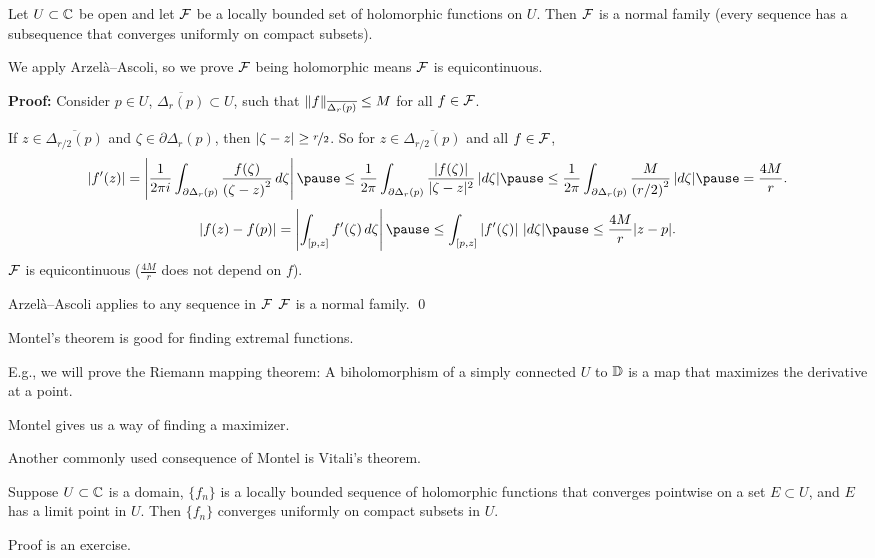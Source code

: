 \documentclass[10pt,aspectratio=169]{beamer}
\begin{document}
\begin{frame}
\begin{theorem}[Montel]
Let $U \subset {\mathbb{C}}$ be open and let ${\mathcal{F}}$
be a locally bounded set of holomorphic functions on $U$.
Then ${\mathcal{F}}$ is a normal family \pause (every sequence has a subsequence that
converges uniformly on compact subsets).
\end{theorem}

\pause
We apply Arzel\`a--Ascoli,
so we prove ${\mathcal{F}}$
being holomorphic means ${\mathcal{F}}$ is equicontinuous.

\medskip

\pause
\textbf{Proof:}
Consider $p \in U$, $\overline{\Delta_r(p)} \subset U$, such that
$\lVert {f} \rVert_{\overline{\Delta_r(p)}} \leq M$ for all $f \in {\mathcal{F}}$.
\pause

If $z \in \overline{\Delta_{r/2}(p)}$ and $\zeta \in \partial \Delta_r(p)$,
then $\lvert {\zeta-z} \rvert \geq \nicefrac{r}{2}$.
\pause
So for $z \in \overline{\Delta_{r/2}(p)}$ and all $f \in {\mathcal{F}}$,
\[
\abs{f'(z)}
=
\abs{
\frac{1}{2\pi i}
\int_{\partial \Delta_r(p)}
\frac{f(\zeta)}{{(\zeta-z)}^2} \, d\zeta
}
\pause \leq
\frac{1}{2\pi}
\int_{\partial \Delta_r(p)}
\frac{\sabs{f(\zeta)}}{\sabs{\zeta-z}^2} \, \sabs{d\zeta}
\pause \leq
\frac{1}{2\pi}
\int_{\partial \Delta_r(p)}
\frac{M}{{(r/2)}^2} \, \sabs{d\zeta}
\pause =
\frac{4 M}{r}.
\]
\pause
\[
\abs{f(z)-f(p)}
=
\abs{
\int_{[p,z]} f'(\zeta) \, d\zeta
}
\pause
\leq
\int_{[p,z]} \abs{f'(\zeta)} \, \sabs{d\zeta}
\pause
\leq
\frac{4 M}{r} \sabs{z-p} .
\]
\pause
\thus \quad ${\mathcal{F}}$ is equicontinuous ($\frac{4M}{r}$ does not depend on $f$).

\medskip
\pause

\thus \quad
Arzel\`a--Ascoli applies
to any sequence in ${\mathcal{F}}$
\pause
\wthus
${\mathcal{F}}$ is a normal family.
\qed
\end{frame}

\begin{frame}
Montel's theorem is good for finding extremal functions.
\pause

E.g., we will prove the Riemann mapping theorem:
\pause
A biholomorphism of a simply
connected $U$ to ${\mathbb{D}}$ is a map that maximizes the derivative at a point.

\pause
Montel gives us a way of finding a maximizer.

\medskip

\pause

Another commonly used consequence of Montel is Vitali's theorem.

\begin{theorem}[Vitali]
Suppose $U \subset {\mathbb{C}}$ is a domain, $\{ f_n \}$ is a locally bounded
sequence of holomorphic functions
that converges pointwise on a set $E \subset U$,
and $E$ has a limit point in $U$.  Then $\{ f_n \}$
converges uniformly on compact subsets in $U$.
\end{theorem}

\pause
Proof is an exercise.

\end{frame}
\end{document}
